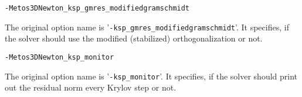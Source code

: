 \documentclass{article}
\begin{document}
\begin{verbatim}
-Metos3DNewton_ksp_gmres_modifiedgramschmidt
\end{verbatim}
The original option name is '\texttt{-ksp\_gmres\_modifiedgramschmidt}'.
It specifies, if the solver should use the modified (stabilized) orthogonalization or not.

\begin{verbatim}
-Metos3DNewton_ksp_monitor
\end{verbatim}
The original option name is '\texttt{-ksp\_monitor}'.
It specifies,
if the solver should print out the residual norm every Krylov step or not.

%
%

%

\end{document}
